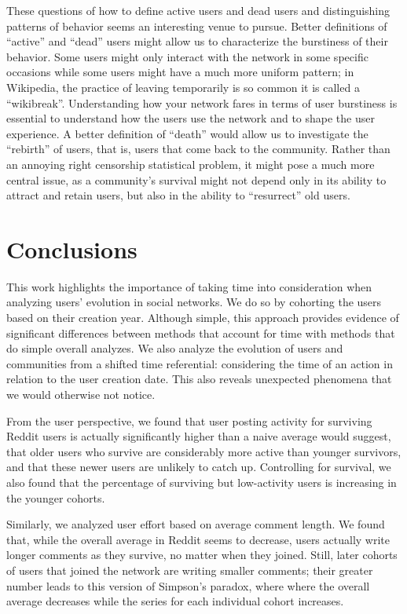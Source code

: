 These questions of how to define active users and dead users and distinguishing patterns of behavior seems an interesting venue to pursue. Better definitions of ``active'' and ``dead'' users might allow us to characterize the burstiness of their behavior.  Some users might only interact with the network in some specific occasions while some users might have a much more uniform pattern; in Wikipedia, the practice of leaving temporarily is so common it is called a ``wikibreak''. Understanding how your network fares in terms of user burstiness is essential to understand how the users use the network and to shape the user experience.  A better definition of ``death'' would allow us to investigate the ``rebirth'' of users, that is, users that come back to the community.  Rather than an annoying right censorship statistical problem, it might pose a much more central issue, as a community's survival might not depend only in its ability to attract and retain users, but also in the ability to ``resurrect'' old users.

\section{Conclusions}

This work highlights the importance of taking time into consideration when analyzing users' evolution in social networks. We do so by cohorting the users based on their creation year. Although simple, this approach provides evidence of significant differences between methods that account for time with methods that do simple overall analyzes.  We also analyze the evolution of users and communities from a shifted time referential: considering the time of an action in relation to the user creation date. This also reveals unexpected phenomena that we would otherwise not notice.

From the user perspective, we found that user posting activity for surviving Reddit users is actually significantly higher than a naive average would suggest, that older users who survive are considerably more active than younger survivors, and that these newer users are unlikely to catch up.   Controlling for survival, we also found that the percentage of surviving but low-activity users is increasing in the younger cohorts.  

Similarly, we analyzed user effort based on average comment length. We found that, while the overall average in Reddit seems to decrease, users actually write longer comments as they survive, no matter when they joined.  Still, later cohorts of users that joined the network are writing smaller comments; their greater number leads to this version of Simpson's paradox, where where the overall average decreases while the series for each individual cohort increases. 

